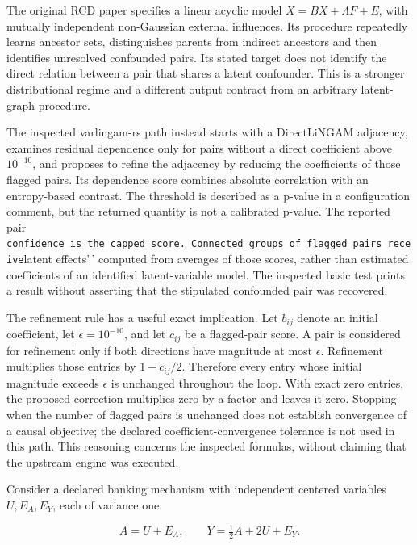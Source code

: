 The original RCD paper specifies a linear acyclic model
\(X=BX+\Lambda F+E\), with mutually independent non-Gaussian external
influences. Its procedure repeatedly learns ancestor sets, distinguishes
parents from indirect ancestors and then identifies unresolved
confounded pairs. Its stated target does not identify the direct
relation between a pair that shares a latent confounder. This is a
stronger distributional regime and a different output contract from an
arbitrary latent-graph procedure. \citep{exec14_olatent_rcd_paper}

The inspected varlingam-rs path instead starts with a DirectLiNGAM
adjacency, examines residual dependence only for pairs without a direct
coefficient above \(10^{-10}\), and proposes to refine the adjacency by
reducing the coefficients of those flagged pairs. Its dependence score
combines absolute correlation with an entropy-based contrast. The
threshold is described as a p-value in a configuration comment, but the
returned quantity is not a calibrated p-value. The reported pair
\texttt{confidence\textquotesingle{}\textquotesingle{}\ is\ the\ capped\ score.\ Connected\ groups\ of\ flagged\ pairs\ receive}latent
effects'\,' computed from averages of those scores, rather than
estimated coefficients of an identified latent-variable model. The
inspected basic test prints a result without asserting that the
stipulated confounded pair was recovered.
\citep{exec14_olatent_varlingam}

The refinement rule has a useful exact implication. Let \(b_{ij}\)
denote an initial coefficient, let \(\epsilon=10^{-10}\), and let
\(c_{ij}\) be a flagged-pair score. A pair is considered for refinement
only if both directions have magnitude at most \(\epsilon\). Refinement
multiplies those entries by \(1-c_{ij}/2\). Therefore every entry whose
initial magnitude exceeds \(\epsilon\) is unchanged throughout the loop.
With exact zero entries, the proposed correction multiplies zero by a
factor and leaves it zero. Stopping when the number of flagged pairs is
unchanged does not establish convergence of a causal objective; the
declared coefficient-convergence tolerance is not used in this path.
This reasoning concerns the inspected formulas, without claiming that
the upstream engine was executed.
\citep{exec14_olatent_varlingam,exec14_olatent_oracle}

Consider a declared banking mechanism with independent centered
variables \(U,E_A,E_Y\), each of variance one:

\[
A=U+E_A,\qquad Y=\tfrac12 A+2U+E_Y.
\]

